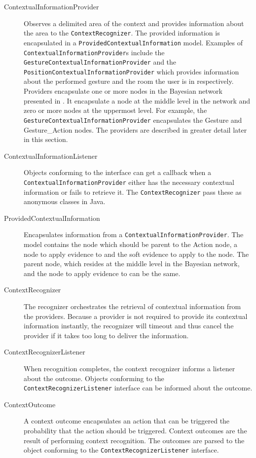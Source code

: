 \begin{description}
\item[ContextualInformationProvider] Observes a delimited area of the context and provides information about the area to the \texttt{ContextRecognizer}. The provided information is encapsulated in a \texttt{ProvidedContextualInformation} model. Examples of \texttt{ContextualInformationProvider}s include the \texttt{GestureContextualInformationProvider} and the \texttt{PositionContextualInformationProvider} which provides information about the performed gesture and the room the user is in respectively. Providers encapsulate one or more nodes in the Bayesian network presented in . It encapsulate a node at the middle level in the network and zero or more nodes at the uppermost level. For example, the \texttt{GestureContextualInformationProvider} encapsulates the Gesture and Gesture\_Action nodes. The providers are described in greater detail later in this section.
\item[ContextualInformationListener] Objects conforming to the interface can get a callback when a \texttt{ContextualInformationProvider} either has the necessary contextual information or fails to retrieve it. The \texttt{ContextRecognizer} pass these as anonymous classes in Java.
\item[ProvidedContextualInformation] Encapsulates information from a \texttt{ContextualInformationProvider}. The model contains the node which should be parent to the Action node, a node to apply evidence to and the soft evidence to apply to the node. The parent node, which resides at the middle level in the Bayesian network, and the node to apply evidence to can be the same.
\item[ContextRecognizer] The recognizer orchestrates the retrieval of contextual information from the providers. Because a provider is not required to provide its contextual information instantly, the recognizer will timeout and thus cancel the provider if it takes too long to deliver the information.
\item[ContextRecognizerListener] When recognition completes, the context recognizer informs a listener about the outcome. Objects conforming to the \texttt{ContextRecognizerListener} interface can be informed about the outcome.
\item[ContextOutcome] A context outcome encapsulates an action that can be triggered the probability that the action should be triggered. Context outcomes are the result of performing context recognition. The outcomes are parsed to the object conforming to the \texttt{ContextRecognizerListener} interface.
\end{description}

